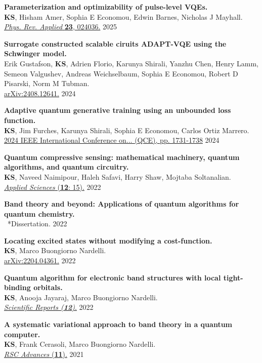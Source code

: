 \documentclass[marginmode, 10pt]{res} %
\newcommand{\me}{\textbf{KS}}       %
\begin{document}
\begin{resume}
\textbf{Parameterization and optimizability of pulse-level VQEs.} \\
    \me, Hisham Amer, Sophia E Economou, Edwin Barnes, Nicholas J Mayhall. \\
    \href{https://arxiv.org/abs/2405.15166}{\textit{Phys. Rev. Applied} \textbf{23}, 024036.} \hfill 2025

\textbf{Surrogate constructed scalable ciruits ADAPT-VQE using the Schwinger model.} \\
    Erik Gustafson, \me, Adrien Florio, Karunya Shirali, Yanzhu Chen, Henry Lamm, Semeon Valgushev, Andreas Weichselbaum, Sophia E Economou, Robert D Pisarski, Norm M Tubman. \\
    \href{https://arxiv.org/abs/2408.12641}{arXiv:2408.12641.} \hfill 2024

\textbf{Adaptive quantum generative training using an unbounded loss function.} \\
    \me, Jim Furches, Karunya Shirali, Sophia E Economou, Carlos Ortiz Marrero. \\
    \href{https://arxiv.org/abs/2408.00218}{2024 IEEE International Conference on... (QCE), pp. 1731-1738} \hfill 2024

\textbf{Quantum compressive sensing: mathematical machinery, quantum algorithms, and quantum circuitry.} \\
    \me, Naveed Naimipour, Haleh Safavi, Harry Shaw, Mojtaba Soltanalian. \\
    \href{https://doi.org/10.3390/app12157525}{\textit{Applied Sciences} (\textbf{12}: 15).} \hfill 2022

\textbf{Band theory and beyond: Applications of quantum algorithms for quantum chemistry.} \\
    ~*Dissertation. \hfill 2022

\textbf{Locating excited states without modifying a cost-function.} \\
    \me, Marco Buongiorno Nardelli. \\
    \href{https://arxiv.org/abs/2204.04361}{arXiv:2204.04361.} \hfill 2022

\textbf{Quantum algorithm for electronic band structures with local tight-binding orbitals.} \\
    \me, Anooja Jayaraj, Marco Buongiorno Nardelli. \\
    \href{https://doi.org/10.1038/s41598-022-13627-x}{\textit{Scientific Reports (\textbf{12})}.} \hfill 2022

\textbf{A systematic variational approach to band theory in a quantum computer.} \\
    \me, Frank Cerasoli, Marco Buongiorno Nardelli. \\
    \href{https://doi.org/10.1039/D1RA07451B}{\textit{RSC Advances} (\textbf{11}).} \hfill 2021


\end{resume}
\end{document}
